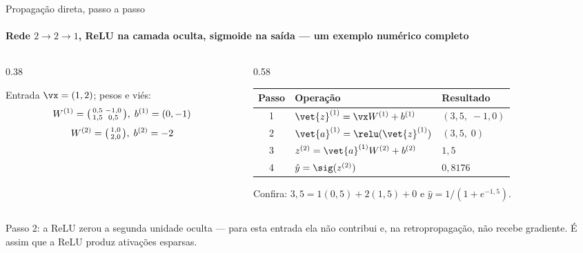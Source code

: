 \documentclass[aspectratio=169, 11pt]{beamer}
\begin{document}
\begin{frame}{Propagação direta, passo a passo}
  \framesubtitle{Rede $2{\to}2{\to}1$, ReLU na camada oculta, sigmoide na saída — um exemplo numérico completo}

  \begin{columns}[T]
    \begin{column}{0.38\textwidth}
      \begin{center}
      \end{center}
      \small Entrada \(\vx = (1, 2)\); pesos e viés:
      \[
        W^{(1)} = \begin{psmallmatrix} 0{,}5 & -1{,}0\\ 1{,}5 & 0{,}5 \end{psmallmatrix},\;
        b^{(1)} = (0, -1)
      \]
      \[
        W^{(2)} = \begin{psmallmatrix} 1{,}0\\ 2{,}0 \end{psmallmatrix},\;
        b^{(2)} = -2
      \]
    \end{column}
    \begin{column}{0.58\textwidth}
      \begin{center}\footnotesize
      \begin{tabular}{@{}cll@{}}
        \toprule
        \textbf{Passo} & \textbf{Operação} & \textbf{Resultado}\\
        \midrule
        1 & \(\vet{z}^{(1)} = \vx W^{(1)} + b^{(1)}\) & \((3{,}5,\; -1{,}0)\)\\
        2 & \(\vet{a}^{(1)} = \relu(\vet{z}^{(1)})\) & \((3{,}5,\; 0)\)\\
        3 & \(z^{(2)} = \vet{a}^{(1)} W^{(2)} + b^{(2)}\) & \(1{,}5\)\\
        4 & \(\hat{y} = \sig(z^{(2)})\) & \(0{,}8176\)\\
        \bottomrule
      \end{tabular}
      \end{center}
      \small Confira: \(3{,}5 = 1(0{,}5) + 2(1{,}5) + 0\) e
      \(\hat y = 1/(1 + e^{-1{,}5})\).
    \end{column}
  \end{columns}

  \begin{alertabox}
    Passo 2: a ReLU zerou a segunda unidade oculta — para esta entrada ela
    não contribui e, na retropropagação, não recebe gradiente. É assim que a
    ReLU produz \alert{ativações esparsas}.
  \end{alertabox}
\end{frame}
\end{document}
